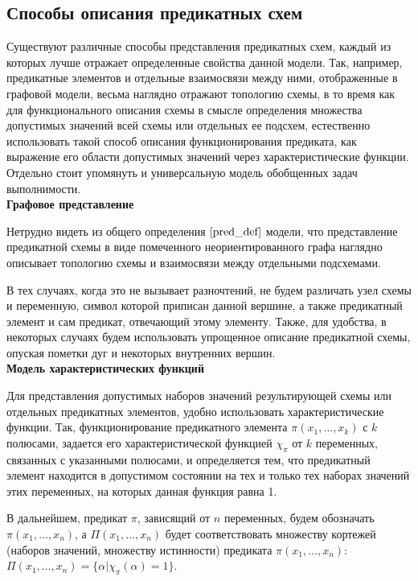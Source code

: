 \documentclass[12pt]{article}
\begin{document}
\subsection{Способы описания предикатных схем}
Существуют различные способы представления предикатных схем, каждый из которых лучше отражает определенные свойства данной 
модели. Так, например, предикатные элементов и отдельные взаимосвязи между ними, отображенные в графовой модели,
весьма наглядно отражают топологию схемы, в то время как для функционального описания схемы в смысле 
определения множества допустимых значений 
всей схемы или отдельных ее подсхем, естественно использовать такой способ описания функционирования предиката,
как выражение его области допустимых значений через характеристические функции. 
Отдельно стоит упомянуть и универсальную модель обобщенных задач выполнимости.\\

\textbf{Графовое представление}

Нетрудно видеть из общего определения $\ref{pred_def}$ модели,
что представление предикатной схемы в виде помеченного неориентированного графа 
наглядно описывает топологию схемы и взаимосвязи 
между отдельными подсхемами.

В тех случаях, когда это не вызывает разночтений, не будем различать узел схемы и переменную, 
символ которой приписан данной вершине, а также предикатный элемент и сам предикат, отвечающий этому элементу. 
Также, для удобства, в некоторых случаях будем использовать упрощенное описание предикатной схемы, 
опуская пометки дуг и некоторых внутренних вершин.  \\

\textbf{Модель характеристических функций}

Для представления допустимых наборов значений результирующей схемы или отдельных предикатных элементов, 
удобно использовать характеристические
функции. Так, функционирование предикатного элемента $\pi(x_1, \dots, x_k)$ с $k$ полюсами,
задается его характеристической функцией $\chi_{\pi}$ от $k$ переменных, 
связанных с указанными полюсами, и определяется тем, что предикатный элемент находится в допустимом состоянии на тех и 
только тех наборах значений этих переменных, на которых данная функция равна 1. 

В дальнейшем, предикат $\pi$, зависящий от $n$ переменных, будем обозначать $\pi(x_1, \dots, x_n)$, а 
$\Pi(x_1, \dots, x_n)$ будет соответствовать множеству кортежей (наборов значений, множеству истинности) 
предиката $\pi(x_1, \dots, x_n)$: $\Pi(x_1, \dots, x_n) = \{ \alpha | \chi_{\pi}(\alpha) = 1 \}$.\\ 
\end{document}
